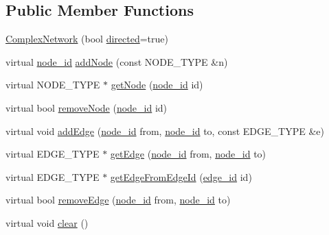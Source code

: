 \subsection*{Public Member Functions}
\begin{DoxyCompactItemize}
\item 
\hyperlink{class_complex_network_a4a16e825e1d8b487067ca21d677617a3}{Complex\+Network} (bool \hyperlink{class_complex_network_ae1f8a32f89d84aab42475d8fe46dfa09}{directed}=true)
\item 
virtual \hyperlink{_complex_network_8hpp_a8323334ca788fde39682469321590d52}{node\+\_\+id} \hyperlink{class_complex_network_af2c31ca0d2142dafa1d88ca3ff22356f}{add\+Node} (const N\+O\+D\+E\+\_\+\+T\+Y\+P\+E \&n)
\item 
virtual N\+O\+D\+E\+\_\+\+T\+Y\+P\+E $\ast$ \hyperlink{class_complex_network_a3711aff250a942a9ad61d0571be82c43}{get\+Node} (\hyperlink{_complex_network_8hpp_a8323334ca788fde39682469321590d52}{node\+\_\+id} id)
\item 
virtual bool \hyperlink{class_complex_network_a33f2b4528cc31296ede98be7e6dcd600}{remove\+Node} (\hyperlink{_complex_network_8hpp_a8323334ca788fde39682469321590d52}{node\+\_\+id} id)
\item 
virtual void \hyperlink{class_complex_network_a52c25eb9c9c642a39681e4040fc0a17d}{add\+Edge} (\hyperlink{_complex_network_8hpp_a8323334ca788fde39682469321590d52}{node\+\_\+id} from, \hyperlink{_complex_network_8hpp_a8323334ca788fde39682469321590d52}{node\+\_\+id} to, const E\+D\+G\+E\+\_\+\+T\+Y\+P\+E \&e)
\item 
virtual E\+D\+G\+E\+\_\+\+T\+Y\+P\+E $\ast$ \hyperlink{class_complex_network_a6a1c638e4604efe06c12ce3065020ec1}{get\+Edge} (\hyperlink{_complex_network_8hpp_a8323334ca788fde39682469321590d52}{node\+\_\+id} from, \hyperlink{_complex_network_8hpp_a8323334ca788fde39682469321590d52}{node\+\_\+id} to)
\item 
virtual E\+D\+G\+E\+\_\+\+T\+Y\+P\+E $\ast$ \hyperlink{class_complex_network_ad440008416fc33500754d77b2532560f}{get\+Edge\+From\+Edge\+Id} (\hyperlink{_complex_network_8hpp_ad7d18d7b90a45b6625704e92d10aa3a0}{edge\+\_\+id} id)
\item 
virtual bool \hyperlink{class_complex_network_a9b2c7df561a2ad5fc14b04a5c5c56828}{remove\+Edge} (\hyperlink{_complex_network_8hpp_a8323334ca788fde39682469321590d52}{node\+\_\+id} from, \hyperlink{_complex_network_8hpp_a8323334ca788fde39682469321590d52}{node\+\_\+id} to)
\item 
virtual void \hyperlink{class_complex_network_a64db5949375a84eba3d9ff559d68fc6e}{clear} ()

\end{DoxyCompactItemize}
